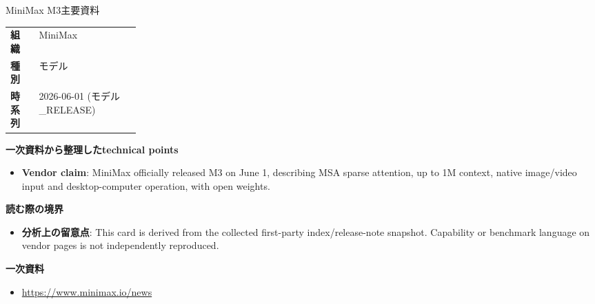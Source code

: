 \begin{technicalnote}{MiniMax M3}{主要資料}
\begin{tabularx}{\linewidth}{@{}>{\bfseries}p{0.22\linewidth}X@{}}
組織 & MiniMax \\
種別 & モデル \\
時系列 & 2026-06-01 (モデル\_RELEASE) \\
\end{tabularx}
\smallskip
{\bfseries 一次資料から整理したtechnical points}
\begin{itemize}[leftmargin=1.5em,itemsep=0.35em]
\item \textbf{Vendor claim}: MiniMax officially released M3 on June 1, describing MSA sparse attention, up to 1M context, native image/video input and desktop-computer operation, with open weights.
\end{itemize}
{\bfseries 読む際の境界}
\begin{itemize}[leftmargin=1.5em,itemsep=0.35em]
\item \textbf{分析上の留意点}: This card is derived from the collected first-party index/release-note snapshot. Capability or benchmark language on vendor pages is not independently reproduced.
\end{itemize}
{\bfseries 一次資料}
\begingroup\sloppy
\begin{itemize}[leftmargin=1.5em,itemsep=0.25em]
\item {\scriptsize\url{https://www.minimax.io/news}}
\end{itemize}
\endgroup
\end{technicalnote}
\medskip

